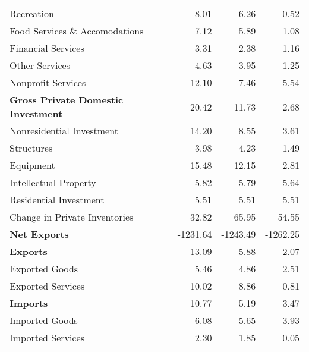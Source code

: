\documentclass[11pt, letterpaper]{article}\usepackage[]{graphicx}\usepackage[]{color}
\begin{document}
\begin{table}[H]
\begin{tabular}{lrrr}
  \hspace{16mm}  Recreation & 8.01 & 6.26 & -0.52 \\ 
  \hspace{16mm}  Food Services \& Accomodations & 7.12 & 5.89 & 1.08 \\ 
  \hspace{16mm}  Financial Services & 3.31 & 2.38 & 1.16 \\ 
  \hspace{16mm}  Other Services & 4.63 & 3.95 & 1.25 \\ 
  \hspace{16mm}  Nonprofit Services & -12.10 & -7.46 & 5.54 \\ 
  \hspace{0mm} \textbf{Gross Private Domestic Investment} & 20.42 & 11.73 & 2.68 \\ 
  \hspace{8mm}  Nonresidential Investment & 14.20 & 8.55 & 3.61 \\ 
  \hspace{16mm}  Structures & 3.98 & 4.23 & 1.49 \\ 
  \hspace{16mm}  Equipment & 15.48 & 12.15 & 2.81 \\ 
  \hspace{16mm}  Intellectual Property & 5.82 & 5.79 & 5.64 \\ 
  \hspace{8mm}  Residential Investment & 5.51 & 5.51 & 5.51 \\ 
  \hspace{8mm}  Change in Private Inventories & 32.82 & 65.95 & 54.55 \\ 
  \hspace{0mm} \textbf{Net Exports} & -1231.64 & -1243.49 & -1262.25 \\ 
  \hspace{0mm} \textbf{Exports} & 13.09 & 5.88 & 2.07 \\ 
  \hspace{8mm}  Exported Goods & 5.46 & 4.86 & 2.51 \\ 
  \hspace{8mm}  Exported Services & 10.02 & 8.86 & 0.81 \\ 
  \hspace{0mm} \textbf{Imports} & 10.77 & 5.19 & 3.47 \\ 
  \hspace{8mm}  Imported Goods & 6.08 & 5.65 & 3.93 \\ 
  \hspace{8mm}  Imported Services & 2.30 & 1.85 & 0.05 \\ 

\end{tabular}
\end{table}
\end{document}

